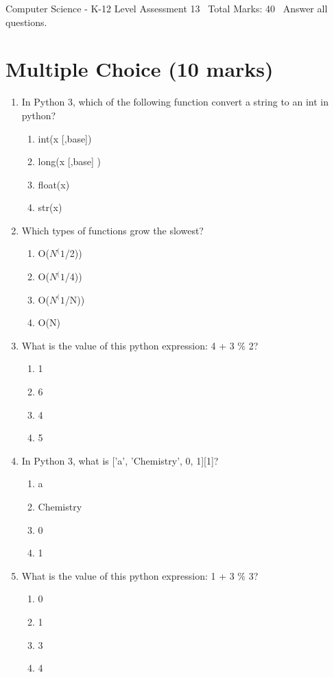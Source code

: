 \documentclass[12pt]{article}
\begin{document}
\begin{center}
Computer Science - K-12 Level Assessment 13 \
Total Marks: 40 \
Answer all questions.
\end{center}

\section*{Multiple Choice (10 marks)}
\begin{enumerate}[label=\arabic*.]
\item In Python 3, which of the following function convert a string to an int in python?
\begin{enumerate}[label=(\alph*)]
    \item int(x [,base])
    \item long(x [,base] )
    \item float(x)
    \item str(x)
\end{enumerate}
\item Which types of functions grow the slowest?
\begin{enumerate}[label=(\alph*)]
    \item O($N^(1$/2))
    \item O($N^(1$/4))
    \item O($N^(1$/N))
    \item O(N)
\end{enumerate}
\item What is the value of this python expression: 4 + 3 \% 2?
\begin{enumerate}[label=(\alph*)]
    \item 1
    \item 6
    \item 4
    \item 5
\end{enumerate}
\item In Python 3, what is ['a', 'Chemistry', 0, 1][1]?
\begin{enumerate}[label=(\alph*)]
    \item a
    \item Chemistry
    \item 0
    \item 1
\end{enumerate}
\item What is the value of this python expression: 1 + 3 \% 3?
\begin{enumerate}[label=(\alph*)]
    \item 0
    \item 1
    \item 3
    \item 4
\end{enumerate}
\end{enumerate}
\end{document}
